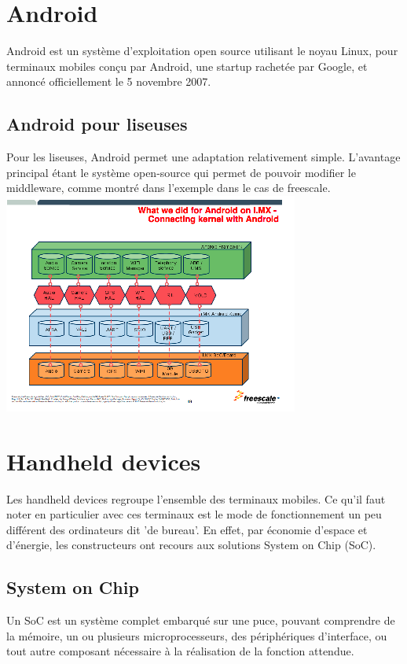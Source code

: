 \section{Android}
Android est un système d'exploitation open source utilisant le noyau Linux, pour terminaux mobiles conçu par Android, une startup rachetée par Google, et annoncé officiellement le 5 novembre 2007.
\subsection{Android pour liseuses}
Pour les liseuses, Android permet une adaptation relativement simple. L'avantage principal étant le système open-source qui permet de pouvoir modifier le middleware, comme montré dans l'exemple dans le cas de freescale.\\
\includegraphics{pileAndroidLiseuse.png}
\section{Handheld devices}
Les handheld devices regroupe l'ensemble des terminaux mobiles. Ce qu'il faut noter en particulier avec ces terminaux est le mode de fonctionnement un peu différent des ordinateurs dit 'de bureau'. En effet, par économie d'espace et d'énergie, les constructeurs ont recours aux solutions System on Chip (SoC).
\subsection{System on Chip}
Un SoC est un système complet embarqué sur une puce, pouvant comprendre de la mémoire, un ou plusieurs microprocesseurs, des périphériques d'interface, ou tout autre composant nécessaire à la réalisation de la fonction attendue.